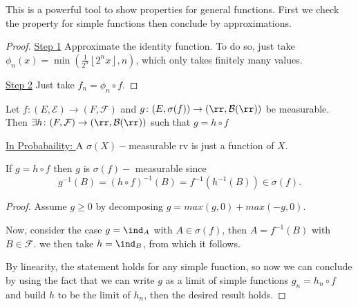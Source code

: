 \documentclass[../main.tex]{subfiles}
\begin{document}
  This is a powerful tool to show properties for general functions.
  First we check the property for simple functions then conclude by
  approximations.

  \begin{proof}
      \hfill

      \underline{Step 1} Approximate the identity function. To do so,
      just take $\phi_n(x) = \min \left( \frac{1}{2^n} \left\lfloor
      2^n x \right\rfloor, n  \right) $, which only takes finitely
      many values.
      \vspace{0.5em}

      \underline{Step 2} Just take $f_n = \phi_n \circ f$.
  \end{proof}

  \begin{application}
    Let $f\colon (E, \mathcal{E}) \to (F, \mathcal{F})$ and $g \colon
    (E, \sigma(f)) \to (\rr, \mathcal{B}(\rr))$ be measurable. Then
    $\exists h \colon (F, \mathcal{F}) \to (\rr, \mathcal{B}(\rr))$
    such that $g = h \circ f $
  \end{application}
  \underline{In Probabaility: } A $\sigma(X)-$measurable rv is just a
  function of $X$.
  \begin{remark}
    If $g = h \circ f$ then $g$ is $\sigma(f)-$ measurable since 
    \[
      g^{-1}(B) = (h \circ f)^{-1}(B) = f^{-1}(h^{-1}(B)) \in
      \sigma(f)
    .\] 
  \end{remark}
  \begin{proof}
    Assume $g \geq 0$ by decomposing $g = max(g, 0) + max(-g, 0)$.

    Now, consider the case $g = \ind_A$ with $A \in \sigma(f)$, then
    $A = f^{-1}(B)$ with $B \in \mathcal{F}$. we then take $h =
    \ind_B$, from which it follows.

    By linearity, the statement holds for any simple function, so now
    we can conclude by using the fact that we can write $g$ as a limit
    of simple functions $g_n = h_n \circ f$ and build $h$ to be the
    limit of $h_n$, then the desired result holds.
  \end{proof}
\end{document}
